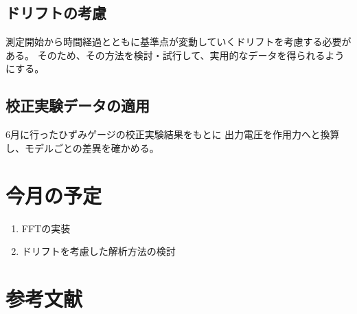 \documentclass[twocolumn,a4j]{jsarticle}
\begin{document}
\subsection{ドリフトの考慮}
測定開始から時間経過とともに基準点が変動していくドリフトを考慮する必要がある。
そのため、その方法を検討・試行して、実用的なデータを得られるようにする。\\
\subsection{校正実験データの適用}
6月に行ったひずみゲージの校正実験結果をもとに
出力電圧を作用力へと換算し、モデルごとの差異を確かめる。\\
\section{今月の予定}
\begin{enumerate}[1.]
    \item FFTの実装
    \item ドリフトを考慮した解析方法の検討
\end{enumerate}
\section{参考文献}
\end{document}
